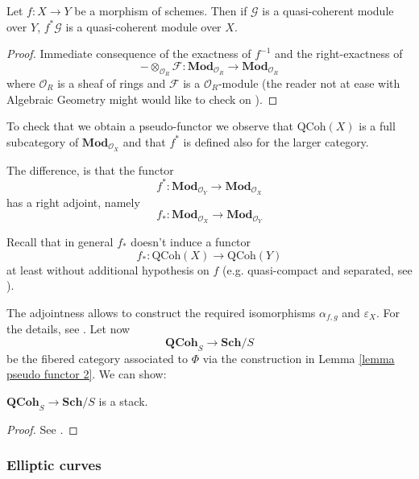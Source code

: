 \begin{lemma}
Let $f \colon X \to Y$ be a morphism of schemes. Then if $\mathcal G$ is a quasi-coherent module over $Y$, $f^* \mathcal G$ is a quasi-coherent module over $X$.
\end{lemma}

\begin{proof}
Immediate consequence of the exactness of $f^{-1}$ and the right-exactness of
\[
- \otimes_{\mathcal O_R} \mathcal F \colon \mathbf{Mod}_{\mathcal O_R} \to \mathbf{Mod}_{\mathcal O_R}
\]
where $\mathcal O_R$ is a sheaf of rings and $\mathcal F$ is a $\mathcal O_R$-module (the reader not at ease with Algebraic Geometry might would like to check on ).
\end{proof}

To check that we obtain a pseudo-functor we observe that $\mathrm{QCoh}(X)$ is a full subcategory of $\mathbf{Mod}_{\mathcal O_X}$ and that $f^*$ is defined also for the larger category.


The difference, is that the functor
\[
f^* \colon \mathbf{Mod}_{\mathcal O_Y} \to \mathbf{Mod}_{\mathcal O_X}
\]
has a right adjoint, namely
\[
f_* \colon \mathbf{Mod}_{\mathcal O_X} \to \mathbf{Mod}_{\mathcal O_Y}
\]

\begin{rmk}
Recall that in general $f_*$ doesn't induce a functor
\[
f_* \colon \mathrm{QCoh}(X) \to \mathrm{QCoh}(Y)
\]
at least without additional hypothesis on $f$ (e.g. quasi-compact and separated, see ).
\end{rmk}

The adjointness allows to construct the required isomorphisms $\alpha_{f,g}$ and $\varepsilon_X$. For the details, see . Let now
\[
\mathbf{QCoh}_S \to \mathbf{Sch}/S
\]
be the fibered category associated to $\Phi$ via the construction in Lemma \ref{lemma pseudo functor 2}. We can show:

\begin{thm}
$\mathbf{QCoh}_S \to \mathbf{Sch}/S$ is a stack.
\end{thm}

\begin{proof}
See .
\end{proof}

\subsubsection{Elliptic curves}


